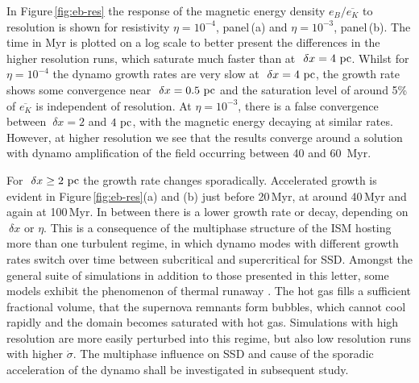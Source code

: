\documentclass[preprint2]{aastex63}
\newcommand\pc{~ {\rm pc}}
\newcommand\dx{~ {\delta x}}
\begin{document}
In Figure\,\ref{fig:eb-res} the response of the magnetic energy density 
$e_B/\overline{e_K}$ to resolution is shown for resistivity $\eta=10^{-4}$,
panel\,(a) and $\eta=10^{-3}$, panel\,(b).
The time in Myr is plotted on a log scale to better present the differences in 
the higher resolution runs, which saturate much faster than at $\dx=4\pc$.
Whilst for $\eta=10^{-4}$ the dynamo growth rates are very slow at $\dx=4\pc$,
the growth rate shows some convergence near $\dx=0.5\pc$ and the saturation
level of around 5\% of $\overline{e_K}$ is independent of resolution.
At $\eta=10^{-3}$, there is a false convergence \citep{FMA91} between
$\dx=2$ and $4\pc$, with the magnetic energy decaying at similar
rates. However, at higher resolution we see that the results converge around a
solution with dynamo amplification of the field occurring between
40 and 60~Myr.

For $\dx\geq2\pc$ the growth rate changes sporadically.
Accelerated growth is evident in Figure\,\ref{fig:eb-res}(a) and (b) just
before 20\,Myr, at around 40\,Myr and again at 100\,Myr.
In between there is a lower growth rate or decay, depending on $\dx$ or $\eta$.
This is a consequence of the multiphase structure of the ISM hosting more than
one turbulent regime, in which dynamo modes with different growth rates 
switch over time between subcritical and supercritical for SSD.
Amongst the general suite of simulations in addition to those presented in this
letter, some models exhibit the phenomenon of thermal runaway
\citep[see e.g.,][]{LOCBN15}.
The hot gas fills a sufficient fractional volume, that the supernova remnants 
form bubbles, which cannot cool rapidly and the domain becomes saturated 
with hot gas.
Simulations with high resolution are more easily perturbed into this regime, but
also low resolution runs with higher $\dot\sigma$.
The multiphase influence on SSD and cause of the sporadic acceleration of the
dynamo shall be investigated in subsequent study.
%
\end{document}
